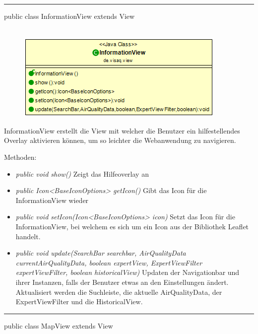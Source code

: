 \rule{\textwidth}{0.4pt}
public class InformationView extends View
\\\\
\begin{minipage}{0.4\textwidth}
    \begin{figure}[H]
        \includegraphics[scale = 0.5]{media/frontend/view/de.view/InformationView_Class.png}
    \end{figure}
\end{minipage} \hfill
\begin{minipage}{0.5\textwidth}
    InformationView erstellt die View mit welcher die Benutzer ein hilfestellendes Overlay aktivieren können, um so leichter
    die Webanwendung zu navigieren.
\end{minipage}

Methoden:
\begin{itemize}
    \item \emph{public void show()} Zeigt das Hilfeoverlay an
    \item \emph{public Icon<BaseIconOptions> getIcon()} Gibt das Icon für die InformationView wieder
    \item \emph{public void setIcon(Icon<BaseIconOptions> icon)} Setzt das Icon für die InformationView, bei welchem es sich um ein Icon aus der Bibliothek \gls{Leaflet} handelt.
    \item \emph{public void update(SearchBar searchbar, AirQualityData currentAirQualityData, boolean expertView, ExpertViewFilter expertViewFilter, boolean historicalView)} Updaten der Navigationbar und ihrer Instanzen, falls der Benutzer etwas an den Einstellungen ändert. Aktualisiert werden die Suchleiste, die aktuelle AirQualityData, der ExpertViewFilter und die HistoricalView.
\end{itemize}

\rule{\textwidth}{0.4pt}
public class MapView extends View

